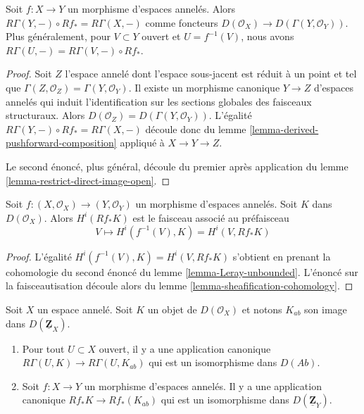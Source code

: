\begin{lemma}

\label{lemma-Leray-unbounded}
Soit $f : X \to Y$ un morphisme d'espaces annelés. Alors $R\Gamma(Y, -) \circ Rf_* = R\Gamma(X, -)$ comme foncteurs $D(\mathcal{O}_X) \to D(\Gamma(Y, \mathcal{O}_Y))$. Plus généralement, pour $V \subset Y$ ouvert et $U = f^{-1}(V)$, nous avons $R\Gamma(U, -) = R\Gamma(V, -) \circ Rf_*$.
\end{lemma}

\begin{proof}
Soit $Z$ l'espace annelé dont l'espace sous-jacent est réduit à un point et tel que $\Gamma(Z, \mathcal{O}_Z) = \Gamma(Y, \mathcal{O}_Y)$. Il existe un morphisme canonique $Y \to Z$ d'espaces annelés qui induit l'identification sur les sections globales des faisceaux structuraux. Alors $D(\mathcal{O}_Z) = D(\Gamma(Y, \mathcal{O}_Y))$. L'égalité $R\Gamma(Y, -) \circ Rf_* = R\Gamma(X, -)$ découle donc du lemme \ref{lemma-derived-pushforward-composition} appliqué à $X \to Y \to Z$.

\medskip\noindent

Le second énoncé, plus général, découle du premier après application du lemme \ref{lemma-restrict-direct-image-open}.

\end{proof}

\begin{lemma}

\label{lemma-unbounded-describe-higher-direct-images}
Soit $f : (X, \mathcal{O}_X) \to (Y, \mathcal{O}_Y)$ un morphisme d'espaces annelés. Soit $K$ dans $D(\mathcal{O}_X)$. Alors $H^i(Rf_*K)$ est le faisceau associé au préfaisceau $$
V \mapsto H^i(f^{-1}(V), K) = H^i(V, Rf_*K)
$$
\end{lemma}

\begin{proof}
L'égalité $H^i(f^{-1}(V), K) = H^i(V, Rf_*K)$ s'obtient en prenant la cohomologie du second énoncé du lemme \ref{lemma-Leray-unbounded}. L'énoncé sur la faisceautisation découle alors du lemme \ref{lemma-sheafification-cohomology}.
\end{proof}

\begin{lemma}

\label{lemma-modules-abelian-unbounded}
Soit $X$ un espace annelé. Soit $K$ un objet de $D(\mathcal{O}_X)$ et notons $K_{ab}$ son image dans $D(\underline{\mathbf{Z}}_X)$.
\begin{enumerate}
\item Pour tout $U \subset X$ ouvert, il y a une application canonique $R\Gamma(U, K) \to R\Gamma(U, K_{ab})$ qui est un isomorphisme dans $D(\textit{Ab})$.
\item Soit $f : X \to Y$ un morphisme d'espaces annelés. Il y a une application canonique $Rf_*K \to Rf_*(K_{ab})$ qui est un isomorphisme dans $D(\underline{\mathbf{Z}}_Y)$.
\end{enumerate}

\end{lemma}

